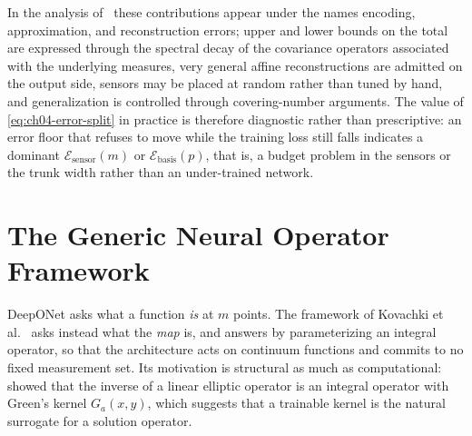 In the analysis of~\cite{lanthaler2022error} these contributions appear under the names encoding, approximation, and reconstruction errors; upper and lower bounds on the total are expressed through the spectral decay of the covariance operators associated with the underlying measures, very general affine reconstructions are admitted on the output side, sensors may be placed at random rather than tuned by hand, and generalization is controlled through covering-number arguments. The value of \eqref{eq:ch04-error-split} in practice is therefore diagnostic rather than prescriptive: an error floor that refuses to move while the training loss still falls indicates a dominant $\mathcal{E}_{\text{sensor}}(m)$ or $\mathcal{E}_{\text{basis}}(p)$, that is, a budget problem in the sensors or the trunk width rather than an under-trained network.

\section{The Generic Neural Operator Framework}

DeepONet asks what a function \emph{is} at $m$ points. The framework of Kovachki et al.~\cite{kovachki2023neural} asks instead what the \emph{map} is, and answers by parameterizing an integral operator, so that the architecture acts on continuum functions and commits to no fixed measurement set. Its motivation is structural as much as computational:  showed that the inverse of a linear elliptic operator is an integral operator with Green's kernel $G_{a}(x,y)$, which suggests that a trainable kernel is the natural surrogate for a solution operator.

